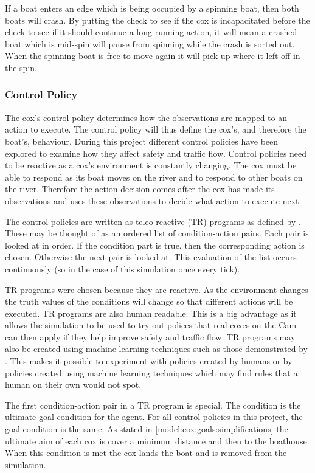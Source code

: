       If a boat enters an edge which is being occupied by a spinning boat, then both boats will crash. By putting the check to see if the cox is incapacitated before the check to see if it should continue a long-running action, it will mean a crashed boat which is mid-spin will pause from spinning while the crash is sorted out. When the spinning boat is free to move again it will pick up where it left off in the spin.
      
      \subsubsection{Control Policy}
      The cox's control policy determines how the observations are mapped to an action to execute. The control policy will thus define the cox's, and therefore the boat's, behaviour. During this project different control policies have been explored to examine how they affect safety and traffic flow. Control policies need to be reactive as a cox's environment is constantly changing. The cox must be able to respond as its boat moves on the river and to respond to other boats on the river. Therefore the action decision comes after the cox has made its observations and uses these observations to decide what action to execute next.
      
      The control policies are written as teleo-reactive (TR) programs as defined by \textcite{Nilsson1994}. These may be thought of as an ordered list of condition-action pairs. Each pair is looked at in order. If the condition part is true, then the corresponding action is chosen. Otherwise the next pair is looked at. This evaluation of the list occurs continuously (so in the case of this simulation once every tick). 
      
      TR programs were chosen because they are reactive. As the environment changes the truth values of the conditions will change so that different actions will be executed. TR programs are also human readable. This is a big advantage as it allows the simulation to be used to try out polices that real coxes on the Cam can then apply if they help improve safety and traffic flow. TR programs may also be created using machine learning techniques such as those demonstrated by \textcite{Kochenderfer2003}. This makes it possible to experiment with policies created by humans or by policies created using machine learning techniques which may find rules that a human on their own would not spot.
      
      The first condition-action pair in a TR program is special. The condition is the ultimate goal condition for the agent. For all control policies in this project, the goal condition is the same. As stated in \ref{model:cox:goals:simplifications} the ultimate aim of each cox is cover a minimum distance and then to the boathouse. When this condition is met the cox lands the boat and is removed from the simulation.

